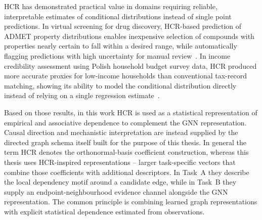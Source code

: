 HCR has demonstrated practical value in domains requiring reliable,
interpretable estimates of conditional distributions instead of single
point predictions. In virtual screening for drug discovery, HCR-based
prediction of ADMET property distributions enables inexpensive
selection of compounds with properties nearly certain to fall within a
desired range, while automatically flagging predictions with high
uncertainty for manual review~\cite{szarek2022hcrmolecular}. In income
credibility assessment using Polish household budget survey data, HCR
produced more accurate proxies for low-income households than
conventional tax-record matching, showing its ability to model the
conditional distribution directly instead of relying on a single
regression estimate~\cite{duda2020hcr-income,brzezinski2022polishinequality}.

Based on those results, in this work HCR is used as a statistical representation of empirical and 
associative dependence to complement the GNN representation.
Causal direction and
mechanistic interpretation are instead supplied by the directed graph
schema itself built for the purpose of this thesis.
In general the term HCR denotes the orthonormal-basis coefficient construction, whereas this thesis
uses HCR-inspired representations -- larger task-specific vectors that 
combine those coefficients with additional descriptors.
In Task~A they describe the local dependency motif around a candidate edge, while in Task~B they supply 
an endpoint-neighbourhood evidence channel alongside the GNN representation.
The common principle is combining learned graph representations with explicit statistical 
dependence estimated from observations.
